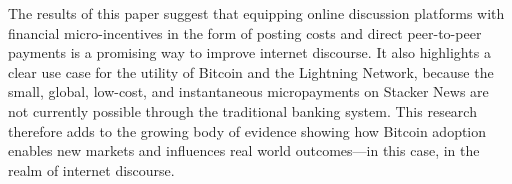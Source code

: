 The results of this paper suggest that equipping online discussion platforms with financial micro-incentives in the form of posting costs and direct peer-to-peer payments is a promising way to improve internet discourse. It also highlights a clear use case for the utility of Bitcoin and the Lightning Network, because the small, global, low-cost, and instantaneous micropayments on Stacker News are not currently possible through the traditional banking system. This research therefore adds to the growing body of evidence showing how Bitcoin adoption enables new markets and influences real world outcomes---in this case, in the realm of internet discourse.


